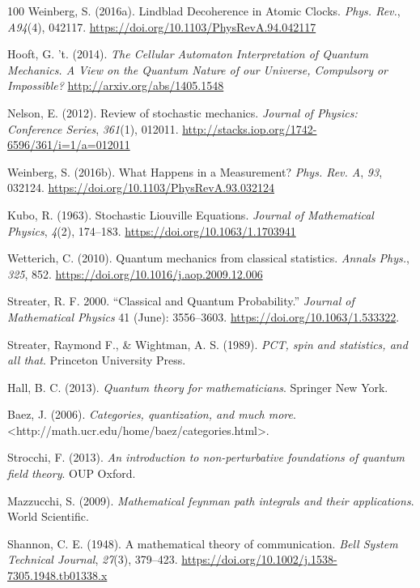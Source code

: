 \documentclass[11pt]{book}
\begin{document}
\begin{thebibliography}{100}
 Weinberg, S. (2016a). Lindblad Decoherence in Atomic Clocks. \emph{Phys.
Rev.}, \emph{A94}(4), 042117.
\url{https://doi.org/10.1103/PhysRevA.94.042117}

 Hooft, G. 't. (2014). \emph{The Cellular Automaton Interpretation of
Quantum Mechanics. A View on the Quantum Nature of our Universe,
Compulsory or Impossible?} \url{http://arxiv.org/abs/1405.1548}

 Nelson, E. (2012). Review of stochastic mechanics. \emph{Journal of
Physics: Conference Series}, \emph{361}(1), 012011.
\url{http://stacks.iop.org/1742-6596/361/i=1/a=012011}

 Weinberg, S. (2016b). What Happens in a Measurement? \emph{Phys. Rev.
A}, \emph{93}, 032124. \url{https://doi.org/10.1103/PhysRevA.93.032124}

 Kubo, R. (1963). Stochastic Liouville Equations. \emph{Journal of
Mathematical Physics}, \emph{4}(2), 174--183.
\url{https://doi.org/10.1063/1.1703941}

 Wetterich, C. (2010). Quantum mechanics from classical statistics.
\emph{Annals Phys.}, \emph{325}, 852.
\url{https://doi.org/10.1016/j.aop.2009.12.006}

 Streater, R. F. 2000. {``Classical and Quantum Probability.''}
\emph{Journal of Mathematical Physics} 41 (June): 3556--3603.
\url{https://doi.org/10.1063/1.533322}.

 Streater, Raymond F., \& Wightman, A. S. (1989). \emph{PCT, spin and
statistics, and all that}. Princeton University Press.

 Hall, B. C. (2013). \emph{Quantum theory for mathematicians}. Springer
New York.

 Baez, J. (2006). \emph{Categories, quantization, and much more}.
\textless http://math.ucr.edu/home/baez/categories.html\textgreater.

 Strocchi, F. (2013). \emph{An introduction to non-perturbative
foundations of quantum field theory}. OUP Oxford.

 Mazzucchi, S. (2009). \emph{Mathematical feynman path integrals and
their applications}. World Scientific.

 Shannon, C. E. (1948). A mathematical theory of communication.
\emph{Bell System Technical Journal}, \emph{27}(3), 379--423.
\url{https://doi.org/10.1002/j.1538-7305.1948.tb01338.x}


\end{thebibliography}
\end{document}
